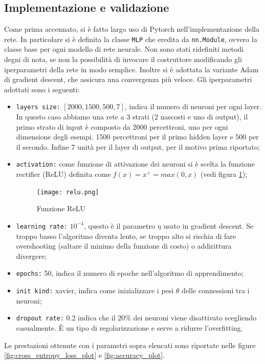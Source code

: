 \subsection{Implementazione e validazione}
Come prima accennato, si è fatto largo uso di Pytorch nell'implementazione della rete. In particolare si è definita la classe \verb|MLP| che eredita da \verb|nn.Module|, ovvero la classe base per ogni modello di rete neurale. Non sono stati ridefiniti metodi degni di nota, se non la possibilità di invocare il costruttore modificando gli iperparametri della rete in modo semplice. Inoltre si è adottata la variante Adam di gradient descent, che assicura una convergenza più veloce. Gli iperparametri adottati sono i seguenti:
\begin{itemize}
    \item \verb|layers size:| $[2000, 1500, 500, 7]$, indica il numero di neuroni per ogni layer. In questo caso abbiamo una rete a 3 strati (2 nascosti e uno di output), il primo strato di input è composto da 2000 percettroni, uno per ogni dimensione degli esempi. 1500 percettroni per il primo hidden layer e 500 per il secondo. Infine 7 unità per il layer di output, per il motivo prima riportato;
    \item \verb|activation:| come funzione di attivazione dei neuroni si è scelta la funzione rectifier (ReLU) definita come $f(x) = x^+ = max(0,x)$ (vedi figura \ref{fig:relu_func});
    \begin{figure}
        \centering
        \texttt{[image: relu.png]}
        \caption{Funzione ReLU}
        \label{fig:relu_func}
    \end{figure}
    \item \verb|learning rate:| $10^{-4}$, questo è il parametro $\eta$ usato in gradient descent. Se troppo basso l'algoritmo diventa lento, se troppo alto si rischia di fare overshooting (saltare il minimo della funzione di costo) o addirittura divergere;
    \item \verb|epochs:| 50, indica il numero di epoche nell'algoritmo di apprendimento;
    \item \verb|init kind:| xavier, indica come inizializzare i pesi $\theta$ delle connessioni tra i neuroni;
    \item \verb|dropout rate:| 0.2 indica che il $20\%$ dei neuroni viene disattivato scegliendo casualmente. È un tipo di regolarizzazione e serve a ridurre l'overfitting.
\end{itemize}
Le prestazioni ottenute con i parametri sopra elencati sono riportate nelle figure \ref{fig:cross_entropy_loss_plot} e \ref{fig:accuracy_plot}. 

